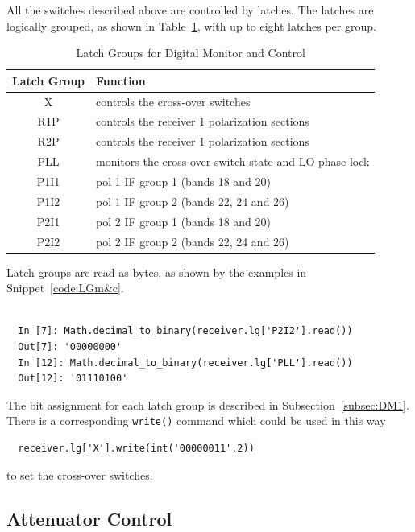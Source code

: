 \documentclass[letterpaper,11pt]{book}
\begin{document}
All the switches described above are controlled by latches.  The latches are
logically grouped, as shown in Table~\ref{tab:latches}, with up to eight
latches per group.
\begin{table}[h!tb]
  \begin{center}
    \caption{\label{tab:latches}Latch Groups for Digital Monitor and Control}
    \begin{tabular}{|c|l|}
      \hline
      {\bf Latch Group} & {\bf Function} \\
      \hline
      X & controls the cross-over switches \\
      R1P & controls the receiver 1 polarization sections \\
      R2P & controls the receiver 1 polarization sections \\
      PLL & monitors the cross-over switch state and LO phase lock \\
      P1I1 & pol 1 IF group 1 (bands 18 and 20) \\
      P1I2 & pol 1 IF group 2 (bands 22, 24 and 26) \\
      P2I1 & pol 2 IF group 1 (bands 18 and 20) \\
      P2I2 & pol 2 IF group 2 (bands 22, 24 and 26) \\
      \hline
    \end{tabular}
  \end{center}
\end{table}
Latch groups are read as bytes, as shown by the examples in 
Snippet~\ref{code:LGm&c}.
\begin{code}[h!tb]
\begin{center}
\begin{verbatim}

  In [7]: Math.decimal_to_binary(receiver.lg['P2I2'].read())
  Out[7]: '00000000'
  In [12]: Math.decimal_to_binary(receiver.lg['PLL'].read())
  Out[12]: '01110100'
\end{verbatim}
\caption{\label{code:LGm&c}Setting a latch group.}
\end{center}
\end{code}
The bit assignment for each latch group is described in
Subsection~\ref{subsec:DM1}.  There is a
corresponding {\tt write()} command which could be used in this way
\begin{verbatim}
  receiver.lg['X'].write(int('00000011',2))
\end{verbatim}
to set the cross-over switches.

\subsection{Attenuator Control}
\end{document}
